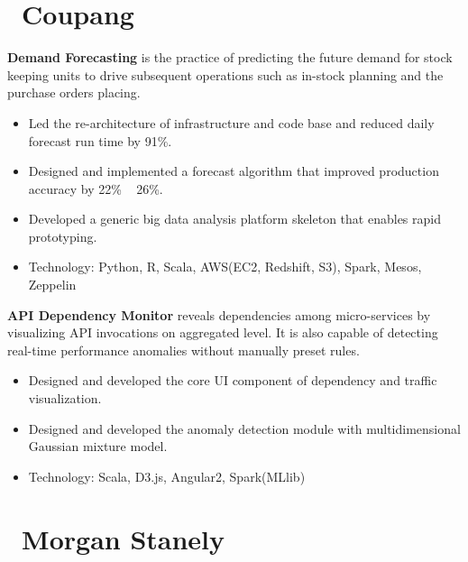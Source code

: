 \documentclass{resume}
\begin{document}





\section{\faUsers\ Coupang}
\textbf{Demand Forecasting} is the practice of predicting the future demand for stock keeping units to drive subsequent operations such as in-stock planning and the purchase orders placing.
\begin{itemize}
  \item Led the re-architecture of infrastructure and code base and reduced daily forecast run time by 91\%.
  \item Designed and implemented a forecast algorithm that improved production accuracy by 22\% ~ 26\%.
  \item Developed a generic big data analysis platform skeleton that enables rapid prototyping.
  \item Technology: Python, R, Scala, AWS(EC2, Redshift, S3), Spark, Mesos, Zeppelin
\end{itemize}

\textbf{API Dependency Monitor} reveals dependencies among micro-services by visualizing API invocations on aggregated level. It is also capable of detecting real-time performance anomalies without manually preset rules.
\begin{itemize}
  \item Designed and developed the core UI component of dependency and traffic visualization.
  \item Designed and developed the anomaly detection module with multidimensional Gaussian mixture model.
  \item Technology: Scala, D3.js, Angular2, Spark(MLlib)
\end{itemize}


\section{\faUsers\ Morgan Stanely}
\smallskip
\end{document}
